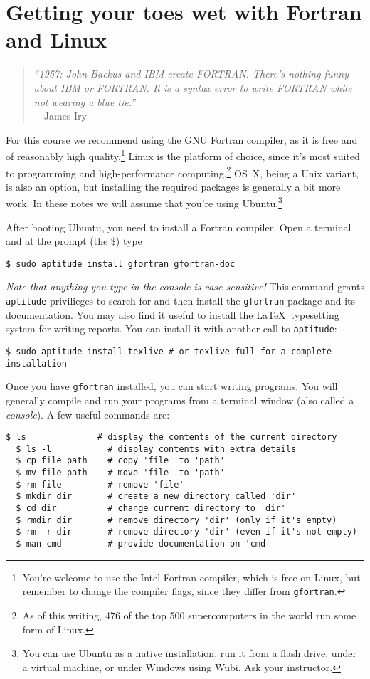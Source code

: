 \chapter{Getting your toes wet with Fortran and Linux}
\label{chap:Getting your toes wet}
\begin{quote}\small
  \emph{``1957: John Backus and IBM create FORTRAN. There's nothing funny about IBM or FORTRAN. It is a syntax error to write FORTRAN while not wearing a blue tie.''} \\ \hspace*{\fill}---James Iry
\end{quote}

For this course we recommend using the GNU Fortran compiler, as it is free and of reasonably high quality.\footnote{You're welcome to use the Intel Fortran compiler, which is free on Linux, but remember to change the compiler flags, since they differ from \texttt{gfortran}.} 
Linux is the platform of choice, since it's most suited to programming and high-performance computing.\footnote{As of this writing, 476 of the top 500 supercomputers in the world run some form of Linux.}
OS~X, being a Unix variant, is also an option, but installing the required packages is generally a bit more work.
In these notes we will assume that you're using Ubuntu.\footnote{You can use Ubuntu as a native installation, run it from a flash drive, under a virtual machine, or under Windows using Wubi.
Ask your instructor.}

After booting Ubuntu, you need to install a Fortran compiler.
Open a terminal and at the prompt (the \$) type
\begin{lstlisting}[style=prompt, nolol]
  $ sudo aptitude install gfortran gfortran-doc
\end{lstlisting}
\emph{Note that anything you type in the console is case-sensitive!} 
This command grants \texttt{aptitude} privilieges to search for and then install the \texttt{gfortran} package and its documentation.
You may also find it useful to install the \LaTeX\ typesetting system for writing reports.
You can install it with another call to \texttt{aptitude}:
\begin{lstlisting}[style=prompt, nolol]
  $ sudo aptitude install texlive # or texlive-full for a complete installation
\end{lstlisting}

Once you have \texttt{gfortran} installed, you can start writing programs.
You will generally compile and run your programs from a terminal window (also called a \emph{console}).
A few useful commands are:
\begin{lstlisting}[style=prompt, nolol]
  $ ls              # display the contents of the current directory
  $ ls -l           # display contents with extra details
  $ cp file path    # copy 'file' to 'path'
  $ mv file path    # move 'file' to 'path'
  $ rm file         # remove 'file'
  $ mkdir dir       # create a new directory called 'dir'
  $ cd dir          # change current directory to 'dir'
  $ rmdir dir       # remove directory 'dir' (only if it's empty)
  $ rm -r dir       # remove directory 'dir' (even if it's not empty)
  $ man cmd         # provide documentation on 'cmd'
\end{lstlisting}

